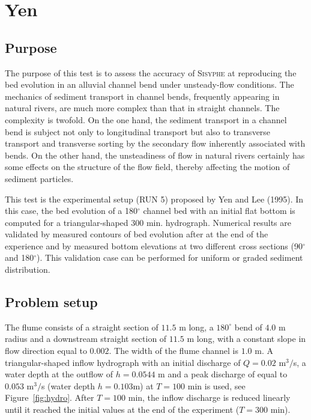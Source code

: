 \chapter{Yen}
%

%
\section{Purpose}
%
The purpose of this test is to assess the accuracy of \textsc{Sisyphe} at reproducing the bed evolution in an alluvial channel bend under unsteady-flow conditions. The mechanics of sediment transport in channel bends, frequently appearing in natural rivers, are much more complex than that in straight channels. The complexity is twofold. On the one hand, the sediment transport in a channel bend is subject not only to longitudinal transport but also to transverse transport and transverse sorting by the secondary flow inherently associated with bends. On the other hand, the unsteadiness of flow in natural rivers certainly has some effects on the structure of the flow field, thereby affecting the motion of sediment particles.

This test is the experimental setup (RUN 5) proposed by Yen and Lee (1995). In this case, the bed evolution of a 180$^{\circ}$ channel bed with an initial flat bottom is computed for a triangular-shaped $300$ min. hydrograph. Numerical results are validated by measured contours of bed evolution after at the end of the experience and by measured bottom elevations at
two different cross sections (90$^{\circ}$ and 180$^{\circ}$). This validation case can be performed for uniform or graded sediment distribution.
%
\section{Problem setup}
%
The flume consists of a straight section of $11.5$ m long, a $180^{\circ}$ bend of $4.0$ m radius and a downstream straight section of
$11.5$ m long, with a constant slope in flow direction equal to $0.002$. The width of the flume channel is $1.0$ m. A triangular-shaped inflow hydrograph with an initial discharge of $Q=0.02$ m$^3/$s, a water depth at the outflow of $h = 0.0544$ m and a peak discharge of equal to $0.053$ m$^3/$s (water depth $h=0.103$m) at $T = 100$ min
is used, see Figure~\ref{fig:hydro}. After $T = 100$ min, the inflow discharge is reduced linearly until it reached the initial values at the end of the experiment ($T = 300$ min).

